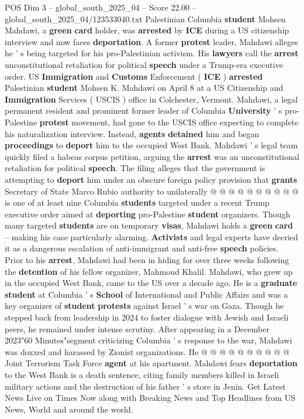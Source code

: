 \begin{textsample}{POS Dim 3 – global\_south\_2025\_04 – Score 22.00 – global\_south\_2025\_04/123533040.txt}  \label{ex:f3_pos_115}
Palestinian Columbia \textbf{student} Mohsen Mahdawi, a \textbf{green} \textbf{card} holder, was \textbf{arrested} by \textbf{ICE} during a US citizenship interview and now faces \textbf{deportation}.
A former \textbf{protest} leader, Mahdawi alleges he ' s being targeted for his pro-Palestinian activism.
His \textbf{lawyers} call the \textbf{arrest} unconstitutional retaliation for political \textbf{speech} under a Trump-era executive order.
US \textbf{Immigration} and \textbf{Customs} Enforcement ( \textbf{ICE} ) \textbf{arrested} Palestinian \textbf{student} Mohsen K.
Mahdawi on April 8 at a US Citizenship and \textbf{Immigration} Services ( USCIS ) office in Colchester, Vermont.
Mahdawi, a legal permanent resident and prominent former leader of Columbia \textbf{University} ' s pro-Palestine \textbf{protest} movement, had gone to the USCIS office expecting to complete his naturalization interview.
Instead, \textbf{agents} \textbf{detained} him and began \textbf{proceedings} to \textbf{deport} him to the occupied West Bank.
Mahdawi ' s legal team quickly filed a habeas corpus petition, arguing the \textbf{arrest} was an unconstitutional retaliation for political \textbf{speech}.
The filing alleges that the government is attempting to \textbf{deport} him under an obscure foreign policy provision that \textbf{grants} Secretary of State Marco Rubio authority to unilaterally @ @ @ @ @ @ @ @ @ @ is one of at least nine Columbia \textbf{students} targeted under a recent Trump executive order aimed at \textbf{deporting} pro-Palestine \textbf{student} organizers.
Though many targeted \textbf{students} are on temporary \textbf{visas}, Mahdawi holds a \textbf{green} \textbf{card} -- making his case particularly alarming. \textbf{Activists} and legal experts have decried it as a dangerous escalation of anti-immigrant and anti-free \textbf{speech} policies.
Prior to his \textbf{arrest}, Mahdawi had been in hiding for over three weeks following the \textbf{detention} of his fellow organizer, Mahmoud Khalil.
Mahdawi, who grew up in the occupied West Bank, came to the US over a decade ago.
He is a \textbf{graduate} \textbf{student} at Columbia ' s \textbf{School} of International and Public Affairs and was a key organizer of \textbf{student} \textbf{protests} against Israel ' s war on Gaza.
Though he stepped back from leadership in 2024 to foster dialogue with Jewish and Israeli peers, he remained under intense scrutiny.
After appearing in a December 2023"60 Minutes"segment criticizing Columbia ' s response to the war, Mahdawi was doxxed and harassed by Zionist organizations.
He @ @ @ @ @ @ @ @ @ @ Joint Terrorism Task Force \textbf{agent} at his apartment.
Mahdawi fears \textbf{deportation} to the West Bank is a death sentence, citing family members killed in Israeli military actions and the destruction of his father ' s store in Jenin.
Get Latest News Live on Times Now along with Breaking News and Top Headlines from US News, World and around the world.

\end{textsample}
